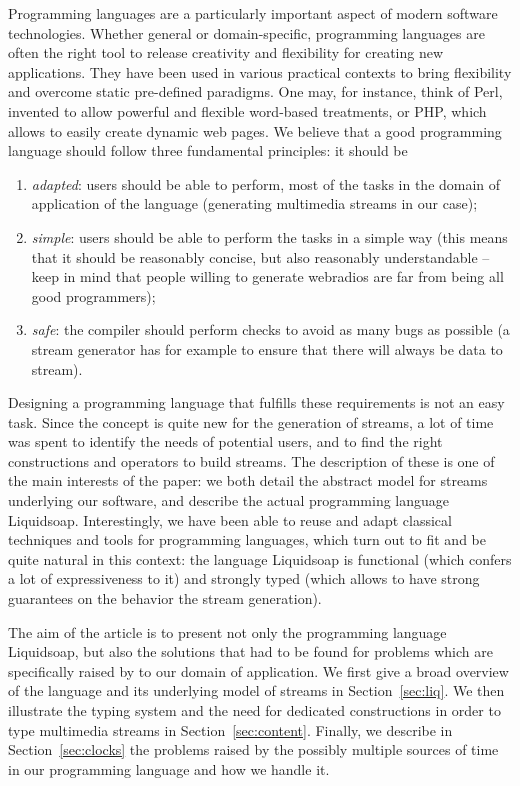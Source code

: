 \documentclass{llncs}
\newcommand{\liquidsoap}{Liquidsoap}
\begin{document}
Programming languages are a particularly important aspect of modern software
technologies.  Whether general or domain-specific, programming languages are
often the right tool to release creativity and flexibility for creating new
applications. They have been used in various practical contexts to bring
flexibility and overcome static pre-defined paradigms. One may, for instance,
think of Perl, invented to allow powerful and flexible word-based treatments, or
PHP, which allows to easily create dynamic web pages. We believe that a good
programming language should follow three fundamental principles: it should be
\begin{enumerate}
\item \emph{adapted}: users should be able to perform, most of the tasks in the
  domain of application of the language (generating multimedia streams in our
  case);
\item \emph{simple}: users should be able to perform the tasks in a simple way
  (this means that it should be reasonably concise, but also reasonably
  understandable -- keep in mind that people willing to generate webradios are
  far from being all good programmers);
\item \emph{safe}: the compiler should perform checks to avoid as many bugs as
  possible (a stream generator has for example to ensure that there will always
  be data to stream).
\end{enumerate}
Designing a programming language that fulfills these requirements is not an easy task.
Since the concept is quite new for the generation of streams, a
lot of time was spent to identify the needs of potential users, and to find the
right constructions and operators to build streams. The description of these is
one of the main interests of the paper: we both detail the abstract model for
streams underlying our software, and describe the actual programming language
\liquidsoap{}. Interestingly, we have been able to reuse and adapt classical
techniques and tools for programming languages, which turn out to fit and be
quite natural in this context: the language \liquidsoap{} is functional (which
confers a lot of expressiveness to it) and strongly typed (which allows to have
strong guarantees on the behavior the stream generation).

The aim of the article is to present not only the programming language
\liquidsoap{}, but also the solutions that had to be found for problems which
are specifically raised by to our domain of application. We first give a broad
overview of the language and its underlying model of streams in
Section~\ref{sec:liq}. We then illustrate the typing system and the need for
dedicated constructions in order to type multimedia streams in
Section~\ref{sec:content}. Finally, we describe in Section~\ref{sec:clocks} the
problems raised by the possibly multiple sources of time in our programming
language and how we handle it.
\end{document}
